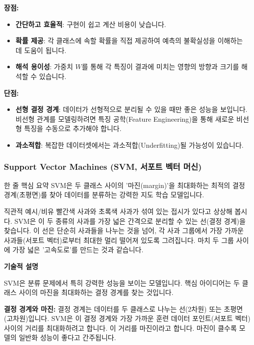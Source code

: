 \documentclass[11pt,a4paper]{article}
\begin{document}
\textbf{장점:}
\begin{itemize}
    \item \textbf{간단하고 효율적}: 구현이 쉽고 계산 비용이 낮습니다.
    \item \textbf{확률 제공}: 각 클래스에 속할 확률을 직접 제공하여 예측의 불확실성을 이해하는 데 도움이 됩니다.
    \item \textbf{해석 용이성}: 가중치 $W$를 통해 각 특징이 결과에 미치는 영향의 방향과 크기를 해석할 수 있습니다.
\end{itemize}

\textbf{단점:}
\begin{itemize}
    \item \textbf{선형 결정 경계}: 데이터가 선형적으로 분리될 수 있을 때만 좋은 성능을 보입니다. 비선형 관계를 모델링하려면 특징 공학(Feature Engineering)을 통해 새로운 비선형 특징을 수동으로 추가해야 합니다.
    \item \textbf{과소적합}: 복잡한 데이터셋에서는 과소적합(Underfitting)될 가능성이 있습니다.
\end{itemize}

\subsubsection{Support Vector Machines (SVM, 서포트 벡터 머신)}

\begin{summarybox}{한 줄 핵심 요약}
SVM은 두 클래스 사이의 '마진(margin)'을 최대화하는 최적의 결정 경계(초평면)를 찾아 데이터를 분류하는 강력한 지도 학습 모델입니다.
\end{summarybox}

\begin{examplebox}{직관적 예시/비유}
빨간색 사과와 초록색 사과가 섞여 있는 접시가 있다고 상상해 봅시다. SVM은 이 두 종류의 사과를 가장 넓은 간격으로 분리할 수 있는 선(결정 경계)을 찾습니다. 이 선은 단순히 사과들을 나누는 것을 넘어, 각 사과 그룹에서 가장 가까운 사과들(서포트 벡터)로부터 최대한 멀리 떨어져 있도록 그려집니다. 마치 두 그룹 사이에 가장 넓은 '고속도로'를 만드는 것과 같습니다.
\end{examplebox}

\textbf{기술적 설명}

SVM은 분류 문제에서 특히 강력한 성능을 보이는 모델입니다. 핵심 아이디어는 두 클래스 사이의 마진을 최대화하는 결정 경계를 찾는 것입니다.

\textbf{결정 경계와 마진:}
결정 경계는 데이터를 두 클래스로 나누는 선(2차원) 또는 초평면(고차원)입니다. SVM은 이 결정 경계와 가장 가까운 훈련 데이터 포인트(서포트 벡터) 사이의 거리를 최대화하려고 합니다. 이 거리를 마진이라고 합니다. 마진이 클수록 모델의 일반화 성능이 좋다고 간주됩니다.
\end{document}
